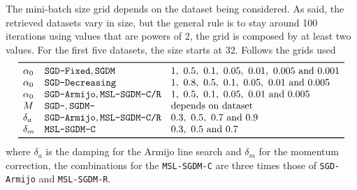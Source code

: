 The mini-batch size grid depends on the dataset being considered. As said, the retrieved datasets vary in size, but the general rule is to stay around 100 iterations using values that are powers of 2, the grid is composed by at least two values. For the first five datasets, the size starts at 32. Follows the grids used
\[
\begin{array}{lll}
\toprule
\alpha_0 & \text{\texttt{SGD-Fixed}}, \text{\texttt{SGDM}} & \numlist{1; 0.5; 0.1; 0.05; 0.01; 0.005; 0.001} \\
\alpha_0 & \text{\texttt{SGD-Decreasing}} & \numlist{1; 0.8; 0.5; 0.1; 0.05; 0.01; 0.005} \\
\alpha_0 & \text{\texttt{SGD-Armijo}}, \text{\texttt{MSL-SGDM-C/R}} & \numlist{1; 0.5; 0.1; 0.05; 0.01; 0.005} \\
M & \text{\texttt{SGD-}}, \text{\texttt{SGDM-}} & \text{depends on dataset} \\
\delta_a & \text{\texttt{SGD-Armijo}}, \text{\texttt{MSL-SGDM-C/R}} & \numlist{0.3; 0.5; 0.7; 0.9} \\
\delta_m & \text{\texttt{MSL-SGDM-C}} & \numlist{0.3; 0.5; 0.7} \\
\bottomrule
\end{array}
\]
where $\delta_a$ is the damping for the Armijo line search and $\delta_m$ for the momentum correction, the combinations for the \texttt{MSL-SGDM-C} are three times those of \texttt{SGD-Armijo} and \texttt{MSL-SGDM-R}.

